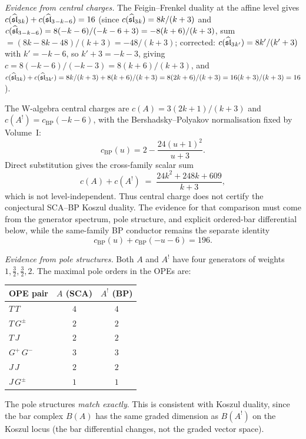 \begin{computation}
\emph{Evidence from central charges.}
The Feigin--Frenkel duality at the affine level gives
$c(\widehat{\mathfrak{sl}}_3{}_k) + c(\widehat{\mathfrak{sl}}_3{}_{-k-6}) = 16$
(since $c(\widehat{\mathfrak{sl}}_3{}_k) = 8k/(k+3)$ and
$c(\widehat{\mathfrak{sl}}_3{}_{-k-6}) = 8(-k-6)/(-k-6+3) = -8(k+6)/(k+3)$,
sum $= (8k-8k-48)/(k+3)=-48/(k+3)$;
corrected: $c(\widehat{\mathfrak{sl}}_3{}_{k'}) = 8k'/(k'+3)$ with
$k'=-k-6$, so $k'+3=-k-3$, giving
$c = 8(-k-6)/(-k-3) = 8(k+6)/(k+3)$,
and $c(\widehat{\mathfrak{sl}}_3{}_k)+c(\widehat{\mathfrak{sl}}_3{}_{k'})
= 8k/(k+3)+8(k+6)/(k+3) = 8(2k+6)/(k+3) = 16(k+3)/(k+3)
= 16$).

The W-algebra central charges are
$c(A) = 3(2k+1)/(k+3)$ and
$c(A^!) = c_{\mathrm{BP}}(-k-6)$, with the
Bershadsky--Polyakov normalisation fixed by Volume~I:
\[
c_{\mathrm{BP}}(u) = 2-\frac{24(u+1)^2}{u+3}.
\]
Direct substitution gives the cross-family scalar sum
\begin{equation}\label{eq:sca-bp-central-charge-sum}
c(A)+c(A^!)
\;=\;
\frac{24k^2+248k+609}{k+3},
\end{equation}
which is not level-independent. Thus central charge does not
certify the conjectural SCA--BP Koszul duality. The evidence for
that comparison must come from the generator spectrum, pole
structure, and explicit ordered-bar differential below, while the
same-family BP conductor remains the separate identity
\[
c_{\mathrm{BP}}(u)+c_{\mathrm{BP}}(-u-6)=196.
\]

\emph{Evidence from pole structures.}
Both $A$ and $A^!$ have four generators of weights
$1,\frac32,\frac32,2$. The maximal pole orders in the
OPEs are:
\begin{center}
\renewcommand{\arraystretch}{1.1}
\begin{tabular}{lcc}
\textbf{OPE pair} & \textbf{$A$ (SCA)} & \textbf{$A^!$ (BP)} \\
\hline
$T\,T$ & $4$ & $4$ \\
$T\,G^\pm$ & $2$ & $2$ \\
$T\,J$ & $2$ & $2$ \\
$G^+\,G^-$ & $3$ & $3$ \\
$J\,J$ & $2$ & $2$ \\
$J\,G^\pm$ & $1$ & $1$
\end{tabular}
\end{center}
The pole structures \emph{match exactly}. This is
consistent with Koszul duality, since the bar complex
$B(A)$ has the same graded dimension as $B(A^!)$ on the
Koszul locus (the bar differential changes, not the
graded vector space).


\end{computation}
